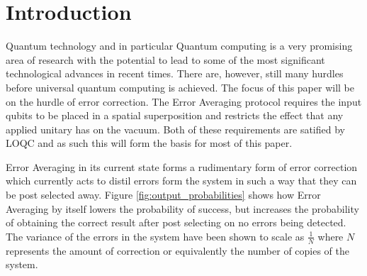 \documentclass[aps,pra,twocolumn,superscriptaddress,numerical]{revtex4-1}
\begin{document}
\pacs{}

\maketitle

\section{Introduction \label{intro}}
Quantum technology and in particular Quantum computing is a very promising area of research with the potential to lead to some of the most significant technological advances in recent times. There are, however, still many hurdles before universal quantum computing is achieved. The focus of this paper will be on the hurdle of error correction. The Error Averaging protocol requires the input qubits to be placed in a spatial superposition and restricts the effect that any applied unitary has on the vacuum. Both of these requirements are satified by LOQC and as such this will form the basis for most of this paper.

Error Averaging in its current state forms a rudimentary form of error correction which currently acts to distil errors form the system in such a way that they can be post selected away. Figure \ref{fig:output_probabilities} shows how Error Averaging by itself lowers the probability of success, but increases the probability of obtaining the correct result after post selecting on no errors being detected. The variance of the errors in the system have been shown to scale as $\frac{1}{N}$ where $N$ represents the amount of correction or equivalently the number of copies of the system.
\end{document}
